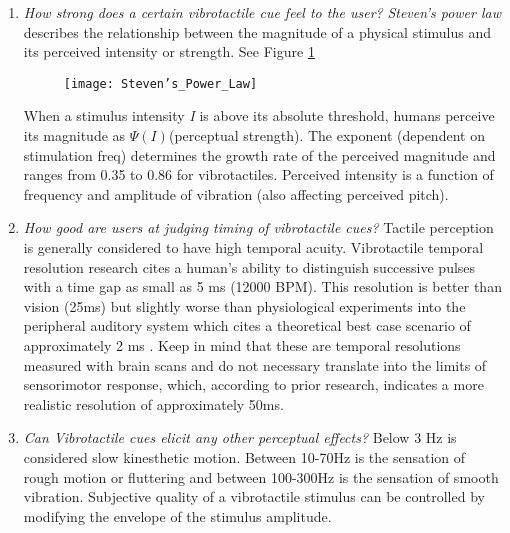 \begin{enumerate}
    \item \emph{How strong does a certain vibrotactile cue feel to the user?}
\textit{Steven's power law} describes the relationship between the magnitude of a physical stimulus and its perceived intensity or strength. See Figure \ref{fig:StevensPowerLaw}
\begin{figure}[H]
    \texttt{[image: Steven's\_Power\_Law]}
    \label{fig:StevensPowerLaw}
\end{figure}
When a stimulus intensity \textit{I} is above its absolute threshold, humans perceive its magnitude as \begin{math}\Psi(I)\end{math}(perceptual strength). The exponent (dependent on stimulation freq) determines the growth rate of the perceived magnitude and ranges from 0.35 to 0.86 for vibrotactiles. Perceived intensity is a function of frequency and amplitude of vibration (also affecting perceived pitch).
    \item \emph{How good are users at judging timing of vibrotactile cues?}
Tactile perception is generally considered to have high temporal acuity.
Vibrotactile temporal resolution research cites a human's ability to distinguish successive pulses with a time gap as small as 5 ms (12000 BPM). This resolution is better than vision (25ms) but slightly worse than physiological experiments into the peripheral auditory system which cites a theoretical best case scenario of approximately 2 ms \cite{fishbach2001auditory} \cite{parsons2006neurobiology}. Keep in mind that these are temporal resolutions measured with brain scans and do not necessary translate into the limits of sensorimotor response, which, according to prior research, indicates a more realistic resolution of approximately 50ms.
    \item \emph{Can Vibrotactile cues elicit any other perceptual effects?} Below 3 Hz is considered slow kinesthetic motion. Between 10-70Hz is the sensation of rough motion or fluttering and between 100-300Hz is the sensation of smooth vibration. Subjective quality of a vibrotactile stimulus can be controlled by modifying the envelope of the stimulus amplitude.
\end{enumerate}

